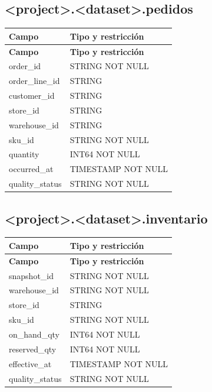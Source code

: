\documentclass[11pt]{article}
\begin{document}
\subsection{<project>.<dataset>.pedidos}

\begingroup\small
\begin{longtable}{@{}>{\raggedright\arraybackslash}p{}>{\raggedright\arraybackslash}p{}@{}}
\toprule
\textbf{Campo} & \textbf{Tipo y restricción} \\
\midrule
\endfirsthead
\toprule
\textbf{Campo} & \textbf{Tipo y restricción} \\
\midrule
\endhead
order\_\allowbreak{}id & STRING NOT NULL \\
order\_\allowbreak{}line\_\allowbreak{}id & STRING \\
customer\_\allowbreak{}id & STRING \\
store\_\allowbreak{}id & STRING \\
warehouse\_\allowbreak{}id & STRING \\
sku\_\allowbreak{}id & STRING NOT NULL \\
quantity & INT64 NOT NULL \\
occurred\_\allowbreak{}at & TIMESTAMP NOT NULL \\
quality\_\allowbreak{}status & STRING NOT NULL \\
\bottomrule
\end{longtable}
\endgroup

\subsection{<project>.<dataset>.inventario}

\begingroup\small
\begin{longtable}{@{}>{\raggedright\arraybackslash}p{}>{\raggedright\arraybackslash}p{}@{}}
\toprule
\textbf{Campo} & \textbf{Tipo y restricción} \\
\midrule
\endfirsthead
\toprule
\textbf{Campo} & \textbf{Tipo y restricción} \\
\midrule
\endhead
snapshot\_\allowbreak{}id & STRING NOT NULL \\
warehouse\_\allowbreak{}id & STRING NOT NULL \\
store\_\allowbreak{}id & STRING \\
sku\_\allowbreak{}id & STRING NOT NULL \\
on\_\allowbreak{}hand\_\allowbreak{}qty & INT64 NOT NULL \\
reserved\_\allowbreak{}qty & INT64 NOT NULL \\
effective\_\allowbreak{}at & TIMESTAMP NOT NULL \\
quality\_\allowbreak{}status & STRING NOT NULL \\
\bottomrule
\end{longtable}
\endgroup
\end{document}
